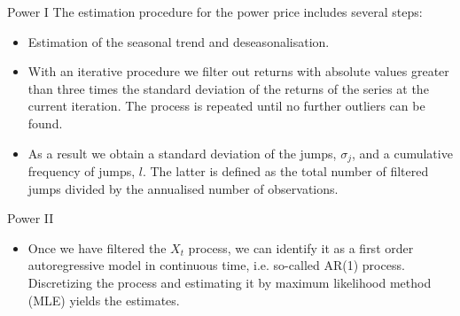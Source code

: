 {Power I}
The estimation procedure for the power price includes several steps:
\begin{itemize}
\item Estimation of the seasonal trend and deseasonalisation.
\item With an iterative procedure we filter out returns with absolute values greater than three times the standard deviation of the returns of the series at the current iteration. The process is repeated until no further outliers can be found.
\item As a result we obtain a standard deviation of the jumps, $\sigma_j$, and a cumulative frequency of jumps, $l$. The latter is defined as the total number of filtered jumps divided by the annualised number of observations.
\end{itemize}



{Power II}
\begin{itemize}
\item Once we have filtered the $X_t$ process, we can identify it as a first order autoregressive model in continuous time, i.e. so-called AR(1) process. Discretizing the process and estimating it by maximum likelihood method (MLE) yields the estimates.
\end{itemize}



